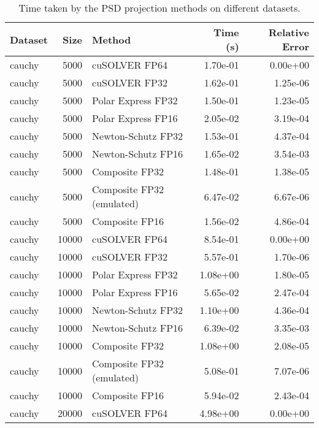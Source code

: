 \begin{table}
\centering
\caption{Time taken by the PSD projection methods on different datasets.}
\label{tab:benchmark_time}
\begin{tabular}{lrlrr}
\toprule
  Dataset &  Size &                    Method &  Time (s) &  Relative Error \\
\midrule
   cauchy &  5000 &             cuSOLVER FP64 &  1.70e-01 &        0.00e+00 \\
   cauchy &  5000 &             cuSOLVER FP32 &  1.62e-01 &        1.25e-06 \\
   cauchy &  5000 &        Polar Express FP32 &  1.50e-01 &        1.23e-05 \\
   cauchy &  5000 &        Polar Express FP16 &  2.05e-02 &        3.19e-04 \\
   cauchy &  5000 &        Newton-Schutz FP32 &  1.53e-01 &        4.37e-04 \\
   cauchy &  5000 &        Newton-Schutz FP16 &  1.65e-02 &        3.54e-03 \\
   cauchy &  5000 &            Composite FP32 &  1.48e-01 &        1.38e-05 \\
   cauchy &  5000 & Composite FP32 (emulated) &  6.47e-02 &        6.67e-06 \\
   cauchy &  5000 &            Composite FP16 &  1.56e-02 &        4.86e-04 \\
   cauchy & 10000 &             cuSOLVER FP64 &  8.54e-01 &        0.00e+00 \\
   cauchy & 10000 &             cuSOLVER FP32 &  5.57e-01 &        1.70e-06 \\
   cauchy & 10000 &        Polar Express FP32 &  1.08e+00 &        1.80e-05 \\
   cauchy & 10000 &        Polar Express FP16 &  5.65e-02 &        2.47e-04 \\
   cauchy & 10000 &        Newton-Schutz FP32 &  1.10e+00 &        4.36e-04 \\
   cauchy & 10000 &        Newton-Schutz FP16 &  6.39e-02 &        3.35e-03 \\
   cauchy & 10000 &            Composite FP32 &  1.08e+00 &        2.08e-05 \\
   cauchy & 10000 & Composite FP32 (emulated) &  5.08e-01 &        7.07e-06 \\
   cauchy & 10000 &            Composite FP16 &  5.94e-02 &        2.43e-04 \\
   cauchy & 20000 &             cuSOLVER FP64 &  4.98e+00 &        0.00e+00 \\

\end{tabular}
\end{table}

